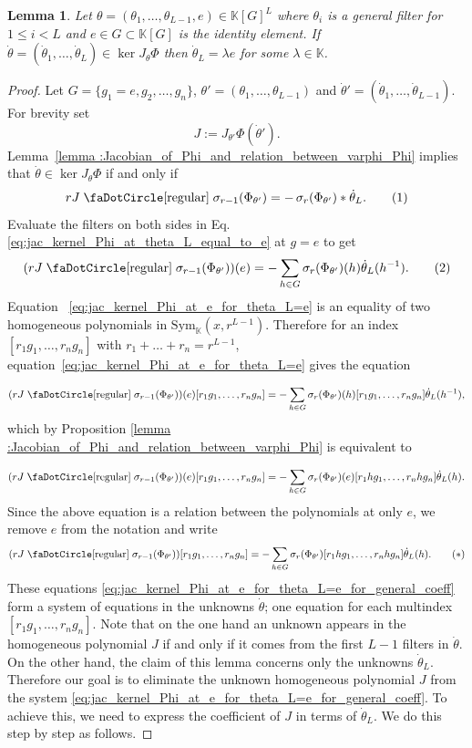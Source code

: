 \documentclass[final]{article}
\newcommand\numberthis{\addtocounter{equation}{1}\tag{\theequation}}
\newcommand{\K}{\mathbb{K}}
\newcommand{\Sym}{\text{Sym}}
\newcommand{\conv}{\ast}
\newcommand{\circbd}{\mathrel{\text{\faDotCircle[regular]}}}
\theoremstyle{definition}
\theoremstyle{plain}
\newtheorem{lemma}[definition]{Lemma}
\begin{document}
\begin{lemma}\label{lemma: jac_Phi_simplified_case}
    Let $\theta = (\theta_1, \hdots, \theta_{L-1}, e) \in \K[G]^L$ where $\theta_i$ is a general filter for $1\leq i < L$ and $e \in G \subset \K[G]$ is the identity element. If $\dot \theta = (\dot \theta_1, \dots, \dot \theta_L) \in \ker J_\theta \Phi$ then $\dot \theta_L = \lambda e$ for some $\lambda \in \K$.
\end{lemma}
\begin{proof}
Let $G=\{g_1=e,g_2,\dots,g_n\}$, $\theta'=(\theta_1,\dots,\theta_{L-1})$ and $\dot\theta'=(\dot\theta_1,\dots,\dot\theta_{L-1})$.
For brevity set
\[
J := J_{\theta'}\Phi(\dot\theta').
\]
Lemma~\ref{lemma :Jacobian_of_Phi_and_relation_between_varphi_Phi}
implies that $\dot\theta\in\ker J_\theta\Phi$ if and only if
\[
rJ \circbd \sigma_{r-1}(\Phi_{\theta'})
= -\,\sigma_r(\Phi_{\theta'})\conv\dot\theta_L.
\numberthis\label{eq:jac_kernel_Phi_at_theta_L_equal_to_e}
\]
Evaluate the filters on both sides in Eq. \eqref{eq:jac_kernel_Phi_at_theta_L_equal_to_e} at $g=e$ to get
    \[
(rJ\circbd\sigma_{r-1}(\Phi_{\theta'}))(e)
=
-\sum_{h\in G}\sigma_r(\Phi_{\theta'})(h)\dot\theta_L(h^{-1}).
\numberthis\label{eq:jac_kernel_Phi_at_e_for_theta_L=e}
\]
Equation ~\eqref{eq:jac_kernel_Phi_at_e_for_theta_L=e} is an equality of two homogeneous polynomials in $\Sym_\K(x, r^{L-1})$. 
Therefore for an index $[r_1g_1,\dots,r_ng_n]$ with $r_1+\dots+r_n=r^{L-1}$,
equation~\eqref{eq:jac_kernel_Phi_at_e_for_theta_L=e} gives the equation

\[
(rJ\circbd\sigma_{r-1}(\Phi_{\theta'}))(e)[r_1g_1,\dots,r_ng_n]
=
-\sum_{h\in G}\sigma_r(\Phi_{\theta'})(h)[r_1g_1,\dots,r_ng_n]\dot\theta_L(h^{-1}),
\]
which by Proposition \ref{lemma :Jacobian_of_Phi_and_relation_between_varphi_Phi} is equivalent to 

\[
(rJ\circbd\sigma_{r-1}(\Phi_{\theta'}))(e)[r_1g_1,\dots,r_ng_n]
=
-\sum_{h\in G}\sigma_r(\Phi_{\theta'})(e)[r_1hg_1,\dots,r_nhg_n]\dot\theta_L(h).
\]
Since the above equation is a relation between the polynomials at only $e$, we remove $e$ from the notation and write 
\[
(rJ\circbd\sigma_{r-1}(\Phi_{\theta'}))[r_1g_1,\dots,r_ng_n]
=
-\sum_{h\in G}\sigma_r(\Phi_{\theta'})[r_1hg_1,\dots,r_nhg_n]\dot\theta_L(h). \tag{$\ast$}\label{eq:jac_kernel_Phi_at_e_for_theta_L=e_for_general_coeff}
\]
These equations \eqref{eq:jac_kernel_Phi_at_e_for_theta_L=e_for_general_coeff} form a system of equations in the unknowns $\dot \theta$; one equation for each multindex  $[r_1g_1,\dots,r_ng_n]$.
Note that on the one hand an unknown appears in the homogeneous polynomial $J$ if and only if it comes from the first $L-1$ filters in $\dot \theta$. On the other hand, the claim of this lemma concerns only the unknowns $\dot \theta_{L}$.
Therefore our goal is to eliminate the unknown homogeneous polynomial \(J\) from the system \eqref{eq:jac_kernel_Phi_at_e_for_theta_L=e_for_general_coeff}. 
To achieve this, we need to express the coefficient of $J$ in terms of $\dot \theta_L$. We do this step by step as follows.


\end{proof}
\end{document}
